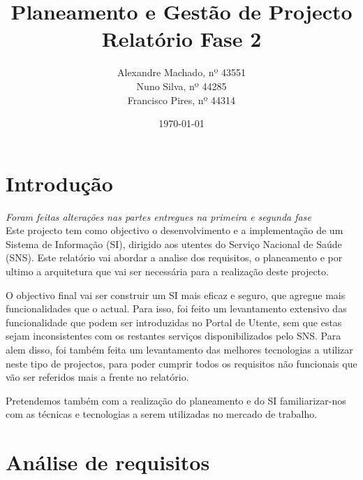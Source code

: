 \documentclass[12pt, a4paper, twoside]{report} %
\begin{document}
\title{%
	\textbf{Planeamento e Gestão de Projecto}\\ 
	\large Relatório Fase 2
}

\author{%
Alexandre Machado, nº 43551 \\
Nuno Silva, nº 44285 \\
Francisco Pires, nº 44314 \\
}

\date{\today}
\maketitle
\tableofcontents

\chapter{Introdução}

\textit{Foram feitas alterações nas partes entregues na primeira e segunda fase} \\


Este projecto tem como objectivo o desenvolvimento e a implementação de um Sistema de Informação (SI), dirigido aos utentes do Serviço Nacional de Saúde (SNS). 
Este relatório vai abordar a analise dos requisitos, o planeamento e por ultimo a arquitetura que vai ser necessária para a realização deste projecto.


O objectivo final vai ser construir um SI mais eficaz e seguro, que agregue mais funcionalidades que o actual. Para isso, foi feito um levantamento extensivo das funcionalidade que podem ser introduzidas no  Portal de Utente, sem que estas sejam inconsistentes com os restantes serviços disponibilizados pelo SNS. Para alem disso, foi também feita um levantamento das melhores tecnologias a utilizar neste tipo de projectos, para poder cumprir todos os requisitos não funcionais que vão ser referidos mais a frente no relatório.

Pretendemos também com a realização do planeamento e do SI familiarizar-nos com as técnicas e tecnologias a serem utilizadas no mercado de trabalho.


\chapter{Análise de requisitos}
\end{document}
